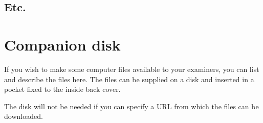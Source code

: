 \documentclass[12pt,openany,a4paper]{book}
\begin{document}
\section{Etc.}

\chapter{Companion disk}

If you wish to make some computer files available to your examiners,
you can list and describe the files here.  The files can be supplied
on a disk and inserted in a pocket fixed to the inside back cover.

The disk will not be needed if you can specify a URL from which the
files can be downloaded.

\cleardoublepage
\end{document}
